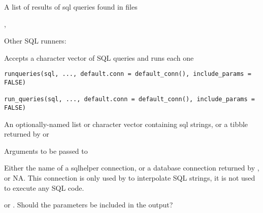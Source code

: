 \documentclass[a4paper]{book}
\begin{document}
%
\begin{Value}
A list of results of sql queries found in files
\end{Value}
%
\begin{SeeAlso}\relax
{}, 

Other SQL runners: 
\end{SeeAlso}
%
\begin{Description}\relax
Accepts a character vector of SQL queries and runs each one
\end{Description}
%
\begin{Usage}
\begin{verbatim}
runqueries(sql, ..., default.conn = default_conn(), include_params = FALSE)

run_queries(sql, ..., default.conn = default_conn(), include_params = FALSE)
\end{verbatim}
\end{Usage}
%
\begin{Arguments}
\begin{ldescription}
\item[\code{sql}] An optionally-named list or character vector containing sql
strings, or a tibble returned by  or 

\item[\code{...}] Arguments to be passed to 

\item[\code{default.conn}] Either the name of a sqlhelper connection, or a database
connection returned by , or NA. This connection is only
used by  to interpolate SQL strings, it is not used to
execute any SQL code.

\item[\code{include\_params}]  or . Should the parameters be
included in the output?
\end{ldescription}
\end{Arguments}
%
\end{document}
